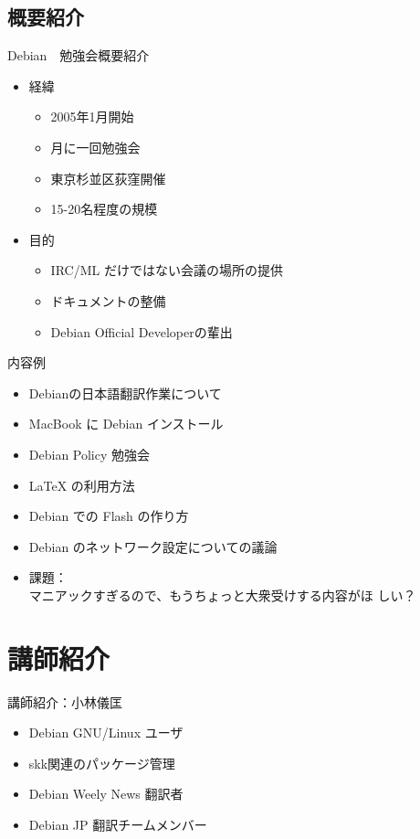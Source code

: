 \documentclass[cjk,dvipdfmx]{beamer}
\begin{document}
\subsection{概要紹介}
\begin{frame}{Debian　勉強会概要紹介}
\begin{itemize}
 \item 経緯
       \begin{itemize}
	\item 2005年1月開始
	\item 月に一回勉強会
	\item 東京杉並区荻窪開催
	\item 15-20名程度の規模
       \end{itemize} 
 \item 目的
       \begin{itemize}
	\item IRC/ML だけではない会議の場所の提供
	\item ドキュメントの整備
	\item Debian Official Developerの輩出
       \end{itemize}
\end{itemize}
\end{frame}

\begin{frame}{内容例}
\begin{itemize}[<+->]
 \item Debianの日本語翻訳作業について
 \item MacBook に Debian インストール
 \item Debian Policy 勉強会
 \item LaTeX の利用方法
 \item Debian での Flash の作り方
 \item Debian のネットワーク設定についての議論
 \item 課題：　\\マニアックすぎるので、もうちょっと大衆受けする内容がほ
       しい？
\end{itemize}
\end{frame}

\section*{講師紹介}
\begin{frame}{講師紹介：小林儀匡}
 \begin{itemize}
  \item Debian GNU/Linux ユーザ
  \item skk関連のパッケージ管理
  \item Debian Weely News 翻訳者
  \item Debian JP 翻訳チームメンバー
 \end{itemize}
\end{frame}
\end{document}
